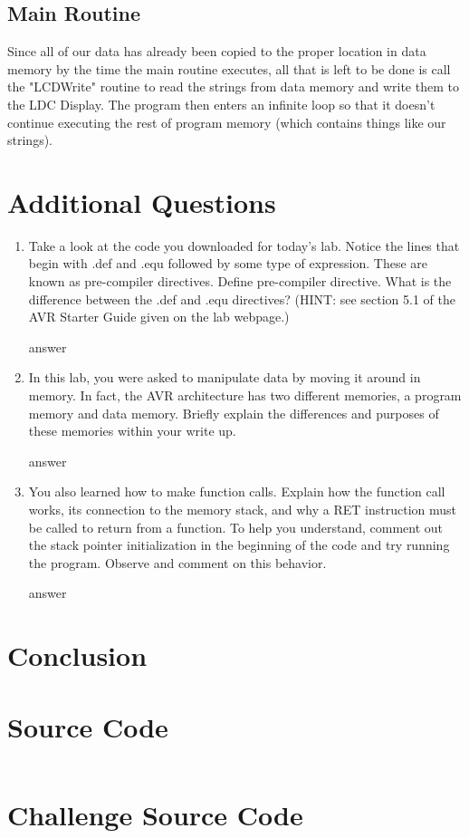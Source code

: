 \documentclass[12pt,letterpaper]{article}
\begin{document}
\subsection{Main Routine}

Since all of our data has already been copied to the proper location in data memory by the time the main routine executes, all that is left to be done is call the "LCDWrite" routine to read the strings from data memory and write them to the LDC Display.  The program then enters an infinite loop so that it doesn't continue executing the rest of program memory (which contains things like our strings).

\section{Additional Questions}
\begin{enumerate}

    \item Take a look at the code you downloaded for today’s lab. Notice the
        lines that begin with .def and .equ followed by some type of
        expression. These are known as pre-compiler directives. Define
        pre-compiler directive. What is the difference between the .def and
        .equ directives? (HINT: see section 5.1 of the AVR Starter Guide given
        on the lab webpage.)

        answer

    \item In this lab, you were asked to manipulate data by moving it around in
        memory. In fact, the AVR architecture has two different memories, a
        program memory and data memory. Briefly explain the differences and
        purposes of these memories within your write up.

        answer

    \item You also learned how to make function calls. Explain how the function
        call works, its connection to the memory stack, and why a RET
        instruction must be called to return from a function. To help you
        understand, comment out the stack pointer initialization in the
        beginning of the code and try running the program. Observe and comment
        on this behavior.

        answer

\end{enumerate}

\section{Conclusion}

\section{Source Code}

\begin{verbatim}
\end{verbatim}

\pagebreak

\section{Challenge Source Code}

\begin{verbatim}
\end{verbatim}
\end{document}
